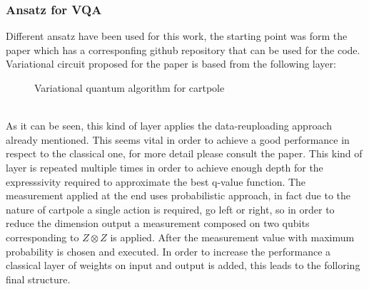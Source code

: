 \subsubsection{Ansatz for VQA}
Different ansatz have been used for this work, the starting point was form the paper \cite{Scholik_2022} which has a corresponfing github repository that can be used for the code.
Variational circuit proposed for the paper is based from the following layer:
\begin{figure}[!h]
	\centering
	\caption{Variational quantum algorithm for cartpole }
	\label{vqa dqn}
\end{figure}\\
As it can be seen, this kind of layer applies the data-reuploading approach already mentioned. This seems vital in order to achieve a good performance in respect to the classical one, for more detail please consult the paper. This kind of layer is repeated multiple times in order to achieve enough depth for the expresssivity required to approximate the best q-value function. The measurement applied at the end uses probabilistic approach, in fact due to the nature of cartpole a single action is required, go left or right, so in order to reduce the dimension output a measurement composed on two qubits corresponding to $Z \otimes Z$ is applied. After the measurement value with maximum probability is chosen and executed. In order to increase the performance a classical layer of weights on input and output is added, this leads to the folloring final structure.
